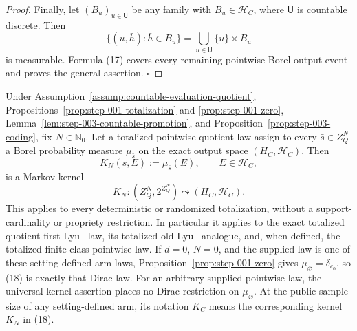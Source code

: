\begin{proof}
Finally, let \((B_u)_{u\in\mathsf U}\) be any family with
\(B_u\in\mathcal H_C\), where \(\mathsf U\) is countable discrete. Then
\[
\{(u,\bar h):\bar h\in B_u\}
=\bigcup_{u\in\mathsf U}\{u\}\times B_u
\tag{17}
\]
is measurable. Formula (17) covers every remaining pointwise Borel output
event and proves the general assertion. \(\square\)


\end{proof}

\begin{proposition}\label{prop:step-003-quotient-kernel}
Under Assumption~\ref{assump:countable-evaluation-quotient}, 
Propositions~\ref{prop:step-001-totalization} and
\ref{prop:step-001-zero},
Lemma~\ref{lem:step-003-countable-promotion}, and
Proposition~\ref{prop:step-003-coding}, fix
\(N\in\mathbb N_0\). Let a totalized pointwise quotient law assign to every
\(\bar s\in Z_Q^N\) a Borel probability measure
\(\mu_{\bar s}\) on the exact output space \((H_C,\mathcal H_C)\). Then
\[
K_N(\bar s,E):=\mu_{\bar s}(E),
\qquad E\in\mathcal H_C,
\tag{18}
\]
is a Markov kernel
\[
K_N:(Z_Q^N,2^{Z_Q^N})\leadsto(H_C,\mathcal H_C).
\tag{19}
\]
This applies to every deterministic or randomized totalization, without a
support-cardinality or propriety restriction. In particular it applies to
the exact totalized quotient-first Lyu~\citep{lyu2025} law, its totalized old-Lyu~\citep{lyu2025} analogue,
and, when defined, the totalized finite-class pointwise law. If \(d=0\),
\(N=0\), and the supplied law is one of these setting-defined arm laws,
Proposition~\ref{prop:step-001-zero} gives
\(\mu_{\varnothing}=\delta_{\bar c_0}\), so (18) is exactly that Dirac law.
For an arbitrary supplied pointwise law, the universal kernel assertion
places no Dirac restriction on \(\mu_{\varnothing}\).
At the public sample size of any setting-defined arm, its notation \(K_C\)
means the corresponding kernel \(K_N\) in (18).


\end{proposition}

